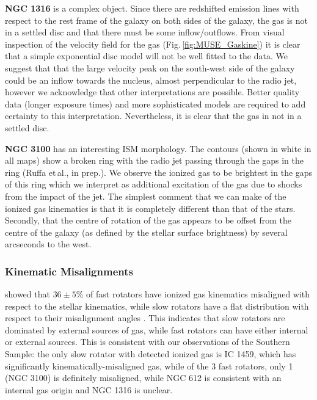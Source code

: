 \documentclass[a4paper,fleqn,usenatbib]{mnras}
\begin{document}
		\textbf{NGC 1316} is a complex object. Since there are redshifted emission lines with respect to the rest frame of the galaxy on both sides of the galaxy, the gas is not in a settled disc and that there must be some inflow/outflows. From visual inspection of the velocity field for the gas (Fig.\,\ref{fig:MUSE_Gaskine}) it is clear that a simple exponential disc model will not be well fitted to the data. We suggest that that the large velocity peak on the south-west side of the galaxy could be an inflow towards the nucleus, almost perpendicular to the radio jet, however we acknowledge that other interpretations are possible. Better quality data (longer exposure times) and more sophisticated models are required to add certainty to this interpretation. Nevertheless, it is clear that the gas in not in a settled disc. 
		


		\textbf{NGC 3100} has an interesting ISM morphology. The  contours (shown in white in all maps) show a broken ring with the radio jet passing through the gaps in the ring (Ruffa et\,al., in prep.). We observe the ionized gas to be brightest in the gaps of this ring which we interpret as additional excitation of the gas due to shocks from the impact of the jet. The simplest comment that we can make of the ionized gas kinematics is that it is completely different than that of the stars. Secondly, that the centre of rotation of the gas appears to be offset from the centre of the galaxy (as defined by the stellar surface brightness) by several arcseconds to the west. 

		\subsubsection{Kinematic Misalignments}
			\citet{Davis2011a} showed that $36\pm5$\% of fast rotators have ionized gas kinematics misaligned with respect to the stellar kinematics, while slow rotators have a flat distribution with respect to their misalignment angles \citep[see fig.\ 4]{Davis2011a}. This indicates that slow rotators are dominated by external sources of gas, while fast rotators can have either internal or external sources. This is consistent with our observations of the Southern Sample: the only slow rotator with detected ionized gas is IC 1459, which has significantly kinematically-misaligned gas, while of the 3 fast rotators, only 1 (NGC 3100) is definitely misaligned, while NGC 612 is consistent with an internal gas origin and NGC 1316 is unclear. %
\end{document}
